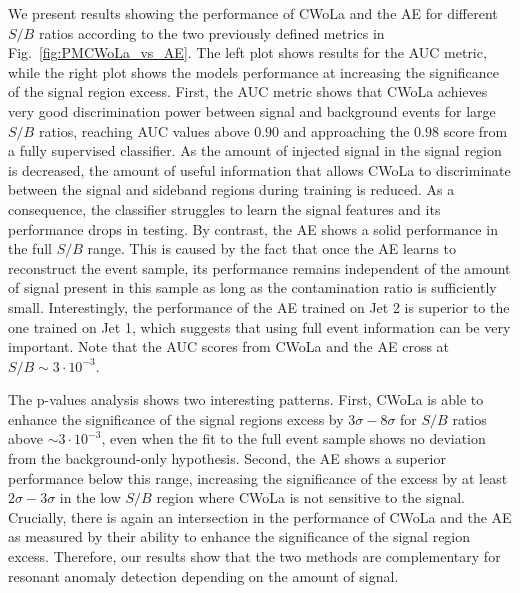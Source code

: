 \documentclass[a4paper,11pt]{article}
\begin{document}
We present results showing the performance of CWoLa and the AE for different $S/B$ ratios according to the two previously defined metrics in Fig.~\ref{fig:PMCWoLa_vs_AE}. The left plot shows results for the AUC metric, while the right plot shows the models performance at increasing the significance of the signal region excess. First, the AUC metric shows that CWoLa achieves very good discrimination power between signal and background events for large $S/B$ ratios, reaching AUC values above $0.90$ and approaching the $0.98$ score from a fully supervised classifier. As the amount of injected signal in the signal region is decreased, the amount of useful information that allows CWoLa to discriminate between the signal and sideband regions during training is reduced. As a consequence, the classifier struggles to learn the signal features and its performance drops in testing. By contrast, the AE shows a solid performance in the full $S/B$ range. This is caused by the fact that once the AE learns to reconstruct the event sample, its performance remains independent of the amount of signal present in this sample as long as the contamination ratio is sufficiently small. Interestingly, the performance of the AE trained on Jet 2 is superior to the one trained on Jet 1, which suggests that using full event information can be very important. Note that the AUC scores from CWoLa and the AE cross at $S/B \sim 3 \cdot 10^{-3}$.

The p-values analysis shows two interesting patterns. First, CWoLa is able to enhance the significance of the signal regions excess by $3 \sigma - 8 \sigma$ for $S/B$ ratios above $\sim 3 \cdot 10^{-3}$, even when the fit to the full event sample shows no deviation from the background-only hypothesis. Second, the AE shows a superior performance below this range, increasing the significance of the excess by at least $2 \sigma - 3 \sigma$ in the low $S/B$ region where CWoLa is not sensitive to the signal. Crucially, there is again an intersection in the performance of CWoLa and the AE as measured by their ability to enhance the significance of the signal region excess. Therefore, our results show that the two methods are complementary for resonant anomaly detection depending on the amount of signal.
\end{document}
